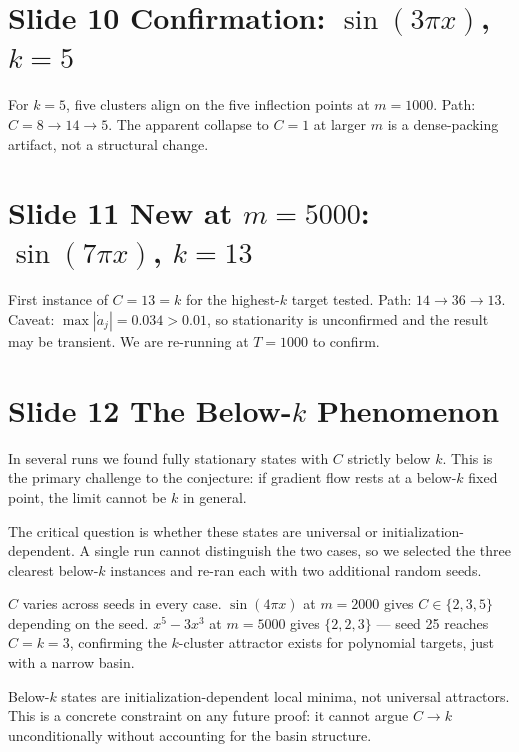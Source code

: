 \documentclass[11pt]{article}
\begin{document}
\section*{Slide 10 \quad Confirmation: $\sin(3\pi x)$, $k = 5$}

For $k = 5$, five clusters align on the five inflection points at $m = 1000$.
Path: $C = 8 \to 14 \to 5$.
The apparent collapse to $C = 1$ at larger $m$ is a dense-packing artifact, not a structural change.

\section*{Slide 11 \quad New at $m=5000$: $\sin(7\pi x)$, $k = 13$}

First instance of $C = 13 = k$ for the highest-$k$ target tested.
Path: $14 \to 36 \to 13$.
Caveat: $\max|\dot{a}_j| = 0.034 > 0.01$, so stationarity is unconfirmed and the result may be transient.
We are re-running at $T = 1000$ to confirm.

\section*{Slide 12 \quad The Below-$k$ Phenomenon}

In several runs we found fully stationary states with $C$ strictly below $k$.
This is the primary challenge to the conjecture: if gradient flow rests at a below-$k$ fixed point, the limit cannot be $k$ in general.

The critical question is whether these states are universal or initialization-dependent.
A single run cannot distinguish the two cases, so we selected the three clearest below-$k$ instances and re-ran each with two additional random seeds.

$C$ varies across seeds in every case.
$\sin(4\pi x)$ at $m = 2000$ gives $C \in \{2, 3, 5\}$ depending on the seed.
$x^5 - 3x^3$ at $m = 5000$ gives $\{2, 2, 3\}$ --- seed 25 reaches $C = k = 3$, confirming the $k$-cluster attractor exists for polynomial targets, just with a narrow basin.

Below-$k$ states are initialization-dependent local minima, not universal attractors.
This is a concrete constraint on any future proof: it cannot argue $C \to k$ unconditionally without accounting for the basin structure.
\end{document}
